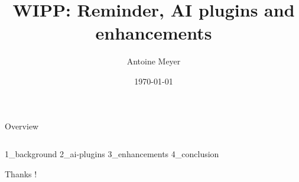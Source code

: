 \documentclass[aspectratio=169,table]{beamer}
\title{WIPP: Reminder, AI plugins and enhancements}
\author[Author]{Antoine Meyer}
\date[\today]{\today}
\begin{document}
  \begin{frame}[plain]
    \titlepage
  \end{frame}

  \begin{frame}{Overview}
    \begin{columns}[onlytextwidth,T]
      \begin{column}{.45\textwidth}
        \tableofcontents[sections=1-2]
      \end{column}
      \begin{column}{.45\textwidth}
        \tableofcontents[sections=3-5]
      \end{column}
    \end{columns}
  \end{frame}

  {1_background}
  {2_ai-plugins}
  {3_enhancements}
  {4_conclusion}

  \begin{frame}[plain]
    \centering
    \LARGE Thanks !
  \end{frame}

\end{document}

